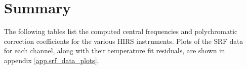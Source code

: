 \newpage
\section{Summary}

The following tables list the computed central frequencies and polychromatic correction coefficients for the various HIRS instruments. Plots of the SRF data for each channel, along with their temperature fit residuals, are shown in appendix \ref{app.srf_data_plots}.



















\clearpage




\begin{appendix}
  
\end{appendix}



